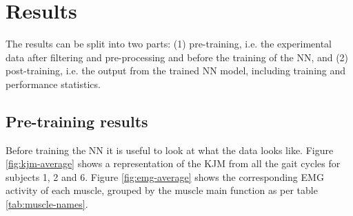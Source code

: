 \documentclass[../main.tex]{subfiles}
\begin{document}
\chapter{Results}
\label{sec:results}
The results can be split into two parts: (1) pre-training, i.e. the experimental data after filtering and pre-processing and before the training of the \ac{NN}, and (2) post-training, i.e. the output from the trained \ac{NN} model, including training and performance statistics.

\section{Pre-training results}
\label{sec:results_pre-training-results}
Before training the \ac{NN} it is useful to look at what the data looks like.
Figure \ref{fig:kjm-average} shows a representation of the \ac{KJM} from all the gait cycles for subjects 1, 2 and 6. 
Figure \ref{fig:emg-average} shows the corresponding \ac{EMG} activity of each muscle, grouped by the muscle main function as per table \ref{tab:muscle-names}.
\end{document}
